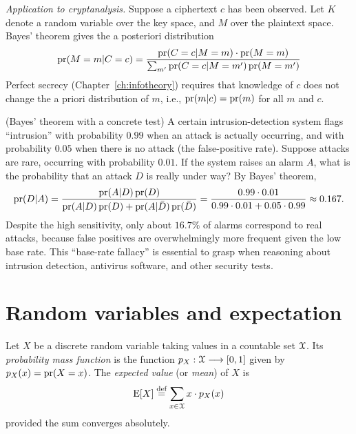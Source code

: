 \documentclass[a4paper, 12pt]{book} %
\begin{document}
\begin{example}
    \emph{Application to cryptanalysis.} Suppose a ciphertext $c$ has been observed. Let $K$ denote a random variable over the key space, and $M$ over the plaintext space. Bayes' theorem gives the a posteriori distribution
    \begin{align}
        \operatorname{pr}(M = m | C = c) = \frac{\operatorname{pr}(C = c | M = m) \cdot \operatorname{pr}(M = m)}{\sum_{m'} \operatorname{pr}(C = c | M = m') \operatorname{pr}(M = m')}
    \end{align}
    Perfect secrecy (Chapter~\ref{ch:infotheory}) requires that knowledge of $c$ does not change the a priori distribution of $m$, i.e., $\operatorname{pr}(m|c) = \operatorname{pr}(m)$ for all $m$ and $c$.
\end{example}

\begin{example}
    (Bayes' theorem with a concrete test) A certain intrusion-detection system flags ``intrusion'' with probability $0.99$ when an attack is actually occurring, and with probability $0.05$ when there is no attack (the false-positive rate). Suppose attacks are rare, occurring with probability $0.01$. If the system raises an alarm $A$, what is the probability that an attack $D$ is really under way? By Bayes' theorem,
    \begin{align}
        \operatorname{pr}(D|A) = \frac{\operatorname{pr}(A|D)\operatorname{pr}(D)}{\operatorname{pr}(A|D)\operatorname{pr}(D) + \operatorname{pr}(A|\bar{D})\operatorname{pr}(\bar{D})}
                 = \frac{0.99 \cdot 0.01}{0.99 \cdot 0.01 + 0.05 \cdot 0.99} \approx 0.167.
    \end{align}
    Despite the high sensitivity, only about $16.7\%$ of alarms correspond to real attacks, because false positives are overwhelmingly more frequent given the low base rate. This ``base-rate fallacy'' is essential to grasp when reasoning about intrusion detection, antivirus software, and other security tests.
\end{example}

\section{Random variables and expectation}

\begin{definition}
    Let $X$ be a discrete random variable taking values in a countable set $\EuScript{X}$. Its \emph{probability mass function} is the function $p_X: \EuScript{X} \longrightarrow [0,1]$ given by $p_X(x) = \operatorname{pr}(X = x)$. The \emph{expected value} (or \emph{mean}) of $X$ is
    \begin{align}
        \mathrm{E}[X] \overset{\text{def}}{=} \sum_{x \in \EuScript{X}} x \cdot p_X(x)
    \end{align}
    provided the sum converges absolutely.
\end{definition}
\end{document}
